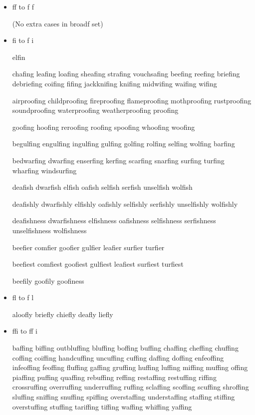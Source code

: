 \begin{itemize}

\item ff to f\kern0pt f

(No extra cases in broadf set)


\item fi to f\kern0pt i

elfin

chafing leafing loafing sheafing strafing vouchsafing
beefing reefing briefing debriefing
coifing fifing jackknifing knifing midwifing waifing wifing

airproofing childproofing fireproofing flameproofing mothproofing rustproofing soundproofing waterproofing weatherproofing proofing

goofing hoofing reroofing roofing spoofing whoofing woofing

begulfing engulfing ingulfing gulfing golfing rolfing selfing wolfing
barfing

bedwarfing dwarfing enserfing kerfing scarfing snarfing
surfing turfing wharfing windsurfing

deafish dwarfish elfish oafish selfish serfish unselfish wolfish

deafishly dwarfishly elfishly oafishly selfishly serfishly unselfishly wolfishly

deafishness dwarfishness elfishness oafishness selfishness serfishness unselfishness wolfishness

beefier comfier goofier gulfier leafier surfier turfier

beefiest comfiest goofiest gulfiest leafiest surfiest turfiest

beefily goofily goofiness



\item fl to f\kern0pt l

aloofly briefly chiefly deafly liefly



\item ffi to ff\kern0pt i

baffing biffing outbluffing bluffing boffing buffing chaffing cheffing chuffing coffing coiffing handcuffing uncuffing cuffing daffing doffing enfeoffing infeoffing feoffing fluffing gaffing gruffing huffing luffing miffing muffing offing piaffing puffing quaffing rebuffing reffing restaffing restuffing riffing crossruffing overruffing underruffing ruffing sclaffing scoffing scuffing shroffing sluffing sniffing snuffing spiffing overstaffing understaffing staffing stiffing overstuffing stuffing tariffing tiffing waffing whiffing yaffing


\end{itemize}
